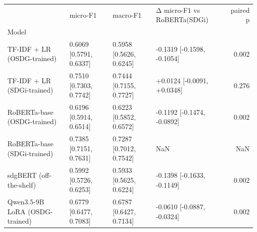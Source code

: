 \begin{tabular}{llllr}
\toprule
 & micro-F1 & macro-F1 & Δ micro-F1 vs RoBERTa(SDGi) & paired p \\
Model &  &  &  &  \\
\midrule
TF-IDF + LR (OSDG-trained) & 0.6069 [0.5791, 0.6337] & 0.5958 [0.5626, 0.6245] & -0.1319 [-0.1598, -0.1054] & 0.002 \\
TF-IDF + LR (SDGi-trained) & 0.7510 [0.7303, 0.7742] & 0.7444 [0.7155, 0.7727] & +0.0124 [-0.0091, +0.0348] & 0.276 \\
RoBERTa-base (OSDG-trained) & 0.6196 [0.5914, 0.6514] & 0.6223 [0.5852, 0.6572] & -0.1192 [-0.1474, -0.0892] & 0.002 \\
RoBERTa-base (SDGi-trained) & 0.7385 [0.7151, 0.7631] & 0.7287 [0.7012, 0.7542] & NaN & NaN \\
sdgBERT (off-the-shelf) & 0.5992 [0.5726, 0.6253] & 0.5933 [0.5625, 0.6224] & -0.1398 [-0.1633, -0.1149] & 0.002 \\
Qwen3.5-9B LoRA (OSDG-trained) & 0.6779 [0.6477, 0.7083] & 0.6787 [0.6427, 0.7134] & -0.0610 [-0.0887, -0.0324] & 0.002 \\
\bottomrule
\end{tabular}
